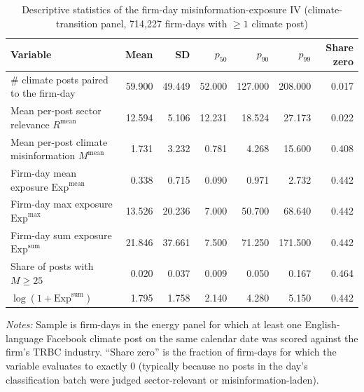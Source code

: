 \begin{table}[htbp]
\centering
\caption{Descriptive statistics of the firm-day misinformation-exposure IV (climate-transition panel, 714,227 firm-days with $\geq 1$ climate post)}
\label{tab:v2_descriptive}
\begin{threeparttable}
\begin{tabular}{l r r r r r r}
\toprule
Variable & Mean & SD & $p_{50}$ & $p_{90}$ & $p_{99}$ & Share zero \\
\midrule
\# climate posts paired to the firm-day & 59.900 & 49.449 & 52.000 & 127.000 & 208.000 & 0.017 \\
Mean per-post sector relevance $R^{\text{mean}}$ & 12.594 & 5.106 & 12.231 & 18.524 & 27.173 & 0.022 \\
Mean per-post climate misinformation $M^{\text{mean}}$ & 1.731 & 3.232 & 0.781 & 4.268 & 15.600 & 0.408 \\
Firm-day mean exposure $\mathrm{Exp}^{\text{mean}}$ & 0.338 & 0.715 & 0.090 & 0.971 & 2.732 & 0.442 \\
Firm-day max exposure $\mathrm{Exp}^{\text{max}}$ & 13.526 & 20.236 & 7.000 & 50.700 & 68.640 & 0.442 \\
Firm-day sum exposure $\mathrm{Exp}^{\text{sum}}$ & 21.846 & 37.661 & 7.500 & 71.250 & 171.500 & 0.442 \\
Share of posts with $M\geq 25$ & 0.020 & 0.037 & 0.009 & 0.050 & 0.167 & 0.464 \\
$\log(1+\mathrm{Exp}^{\text{sum}})$ & 1.795 & 1.758 & 2.140 & 4.280 & 5.150 & 0.442 \\
\bottomrule
\end{tabular}
\begin{tablenotes}\small
\item \textit{Notes:} Sample is firm-days in the energy panel for which at least one English-language Facebook
climate post on the same calendar date was scored against the firm's TRBC industry. ``Share zero'' is the
fraction of firm-days for which the variable evaluates to exactly 0 (typically because no posts in the day's
classification batch were judged sector-relevant or misinformation-laden).
\end{tablenotes}
\end{threeparttable}
\end{table}